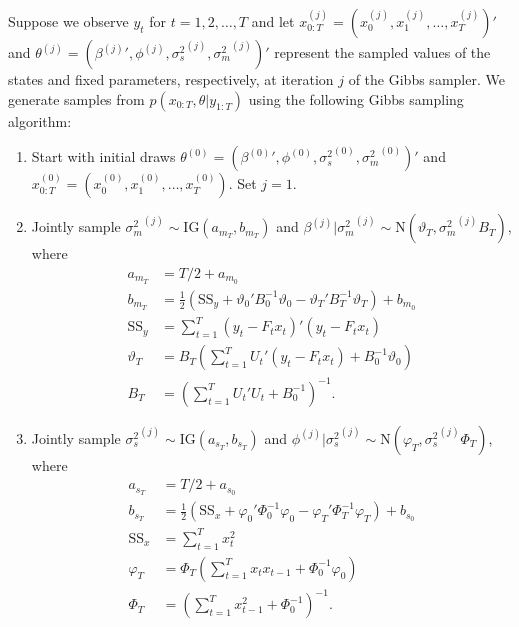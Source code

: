 Suppose we observe $y_t$ for $t = 1,2,\ldots,T$ and let $x^{(j)}_{0:T} = \left(x^{(j)}_0, x^{(j)}_1, \ldots, x^{(j)}_T\right)'$ and $\theta^{(j)} = \left({\beta^{(j)}}', \phi^{(j)}, {\sigma^2_s}^{(j)}, {\sigma^2_m}^{(j)}\right)'$ represent the sampled values of the states and fixed parameters, respectively, at iteration $j$ of the Gibbs sampler. We generate samples from $p(x_{0:T},\theta|y_{1:T})$ using the following Gibbs sampling algorithm:
\begin{enumerate}
\item \label{step:init} Start with initial draws $\theta^{(0)} = \left({\beta^{(0)}}', \phi^{(0)}, {\sigma^2_s}^{(0)}, {\sigma^2_m}^{(0)}\right)'$ and \\ $x^{(0)}_{0:T} = \left(x^{(0)}_0, x^{(0)}_1, \ldots, x^{(0)}_T\right)$. Set $j = 1$.
\item \label{step:gibbs:dr:beta} Jointly sample ${\sigma^2_m}^{(j)} \sim \mbox{IG}(a_{m_T}, b_{m_T})$ and $\beta^{(j)}|{\sigma^2_m}^{(j)} \sim \mbox{N}(\vartheta_T,{\sigma^2_m}^{(j)}B_T)$, where
\begin{align}
a_{m_T} &= T/2 + a_{m_0} \label{eqn:dr:am} \\
b_{m_T} &= \frac{1}{2}(\mbox{SS}_y + \vartheta_0'B_0^{-1}\vartheta_0 - \vartheta_T'B_T^{-1}\vartheta_T) + b_{m_0} \label{eqn:dr:bm} \\
\mbox{SS}_y &= \sum^T_{t=1} (y_t - F_tx_t)'(y_t - F_tx_t) \label{eqn:dr:ssy} \\
\vartheta_T &= B_T\left( \sum^T_{t=1} U_t'(y_t - F_tx_t) + B_0^{-1}\vartheta_0\right) \label{eqn:dr:b} \\
B_T &= \left(\sum^T_{t=1} U_t'U_t + B_0^{-1}\right)^{-1}. \label{eqn:dr:B}
\end{align}
\item \label{step:gibbs:dr:phi} Jointly sample ${\sigma^2_s}^{(j)} \sim \mbox{IG}(a_{s_T}, b_{s_T})$ and $\phi^{(j)}|{\sigma^2_s}^{(j)} \sim \mbox{N}(\varphi_T,{\sigma^2_s}^{(j)}\Phi_T)$, where
\begin{align}
a_{s_T} &= T/2 + a_{s_0} \label{eqn:dr:as} \\
b_{s_T} &= \frac{1}{2}(\mbox{SS}_x + \varphi_0'\Phi_0^{-1}\varphi_0 - \varphi_T'\Phi_T^{-1}\varphi_T) + b_{s_0} \label{eqn:dr:bs} \\
\mbox{SS}_x &= \sum^T_{t=1} x_t^2 \label{eqn:dr:ssx} \\
\varphi_T &= \Phi_T\left( \sum^T_{t=1} x_tx_{t-1} + \Phi_0^{-1}\varphi_0\right) \label{eqn:dr:phi} \\
\Phi_T &= \left(\sum^T_{t=1} x_{t-1}^2 + \Phi_0^{-1}\right)^{-1}. \label{eqn:dr:Phi}

\end{align}
\end{enumerate}

